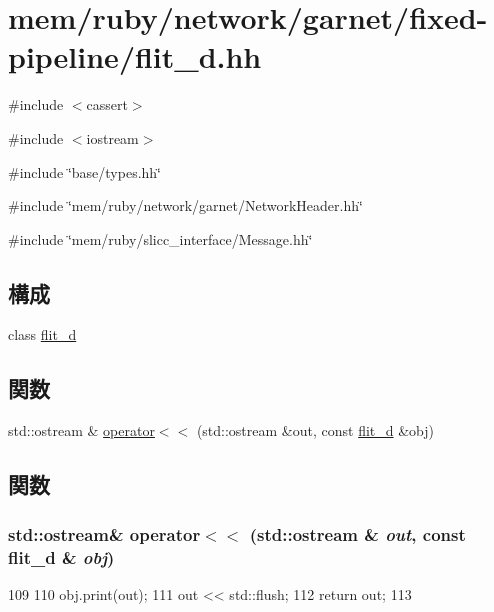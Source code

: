 \hypertarget{flit__d_8hh}{
\section{mem/ruby/network/garnet/fixed-\/pipeline/flit\_\-d.hh}
\label{flit__d_8hh}
}
{\ttfamily \#include $<$cassert$>$}\par
{\ttfamily \#include $<$iostream$>$}\par
{\ttfamily \#include \char`\"{}base/types.hh\char`\"{}}\par
{\ttfamily \#include \char`\"{}mem/ruby/network/garnet/NetworkHeader.hh\char`\"{}}\par
{\ttfamily \#include \char`\"{}mem/ruby/slicc\_\-interface/Message.hh\char`\"{}}\par
\subsection*{構成}
\begin{DoxyCompactItemize}
\item 
class \hyperlink{classflit__d}{flit\_\-d}
\end{DoxyCompactItemize}
\subsection*{関数}
\begin{DoxyCompactItemize}
\item 
std::ostream \& \hyperlink{flit__d_8hh_af6b42974e8f7e19bf0d1422f4efa4971}{operator$<$$<$} (std::ostream \&out, const \hyperlink{classflit__d}{flit\_\-d} \&obj)
\end{DoxyCompactItemize}


\subsection{関数}
\hypertarget{flit__d_8hh_af6b42974e8f7e19bf0d1422f4efa4971}{
\subsubsection[{operator$<$$<$}]{\setlength{\rightskip}{0pt plus 5cm}std::ostream\& operator$<$$<$ (std::ostream \& {\em out}, \/  const {\bf flit\_\-d} \& {\em obj})}}
\label{flit__d_8hh_af6b42974e8f7e19bf0d1422f4efa4971}



\begin{DoxyCode}
109 {
110     obj.print(out);
111     out << std::flush;
112     return out;
113 }
\end{DoxyCode}
